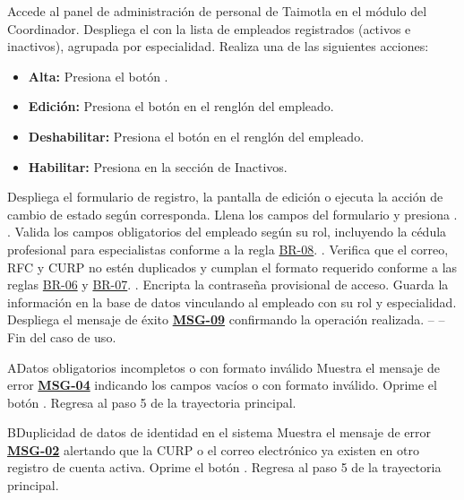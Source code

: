 \begin{UCtrayectoria}
	\UCpaso[\UCactor] Accede al panel de administración de personal de Taimotla en el módulo del Coordinador.
	\UCpaso Despliega el  con la lista de empleados registrados (activos e inactivos), agrupada por especialidad.
	\UCpaso[\UCactor] Realiza una de las siguientes acciones:
		\begin{itemize}
			\item \textbf{Alta:} Presiona el botón .
			\item \textbf{Edición:} Presiona el botón  en el renglón del empleado.
			\item \textbf{Deshabilitar:} Presiona el botón  en el renglón del empleado.
			\item \textbf{Habilitar:} Presiona  en la sección de Inactivos.
		\end{itemize}
	\UCpaso Despliega el formulario de registro, la pantalla de edición o ejecuta la acción de cambio de estado según corresponda.
	\UCpaso[\UCactor] Llena los campos del formulario y presiona . .
	\UCpaso Valida los campos obligatorios del empleado según su rol, incluyendo la cédula profesional para especialistas conforme a la regla \hyperlink{BR-08}{BR-08}. .
	\UCpaso Verifica que el correo, RFC y CURP no estén duplicados y cumplan el formato requerido conforme a las reglas \hyperlink{BR-06}{BR-06} y \hyperlink{BR-07}{BR-07}. .
	\UCpaso Encripta la contraseña provisional de acceso.
	\UCpaso Guarda la información en la base de datos vinculando al empleado con su rol y especialidad.
	\UCpaso Despliega el mensaje de éxito \hyperlink{mMSG09}{\bf MSG-09} confirmando la operación realizada.
	\UCpaso[] -- -- Fin del caso de uso.
\end{UCtrayectoria}

\begin{UCtrayectoriaA}{A}{Datos obligatorios incompletos o con formato inválido}
	\UCpaso Muestra el mensaje de error \hyperlink{mMSG04}{\bf MSG-04} indicando los campos vacíos o con formato inválido.
	\UCpaso[\UCactor] Oprime el botón .
	\UCpaso Regresa al paso 5 de la trayectoria principal.
\end{UCtrayectoriaA}

\begin{UCtrayectoriaA}{B}{Duplicidad de datos de identidad en el sistema}
	\UCpaso Muestra el mensaje de error \hyperlink{mMSG02}{\bf MSG-02} alertando que la CURP o el correo electrónico ya existen en otro registro de cuenta activa.
	\UCpaso[\UCactor] Oprime el botón .
	\UCpaso Regresa al paso 5 de la trayectoria principal.
\end{UCtrayectoriaA}

